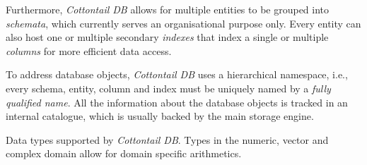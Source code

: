 Furthermore, \emph{Cottontail DB} allows for multiple entities to be grouped into \emph{schemata}, which currently serves an organisational purpose only. Every entity can also host one or multiple secondary \emph{indexes} that index a single or multiple \emph{columns} for more efficient data access.

To address database objects, \emph{Cottontail DB} uses a hierarchical namespace, i.e., every schema, entity, column and index must be uniquely named by a \emph{fully qualified name}. All the information about the database objects is tracked in an internal catalogue, which is usually backed by the main storage engine.

\begin{table}

    \caption{Data types supported by \emph{Cottontail DB}. Types in the numeric, vector and complex domain allow for domain specific arithmetics.}
    \label{table:cottontail_types}


\end{table}
